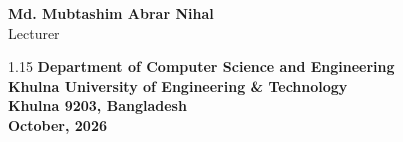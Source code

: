 \documentclass[11pt,a4paper]{article}
\newcommand{\SubmissionDate}{October, 2026}
\newcommand{\TeacherTwo}{Md. Mubtashim Abrar Nihal}
\newcommand{\TeacherTwoTitle}{Lecturer}
\begin{document}
\begin{titlepage}
\begin{center}
        {\fontsize{12}{15}\selectfont \textbf{\TeacherTwo}}\\
        {\fontsize{11}{14}\selectfont \TeacherTwoTitle}

        \vfill

        \begin{spacing}{1.15}
            {\fontsize{12}{16}\selectfont
            \textbf{Department of Computer Science and Engineering}}\\
            {\fontsize{12}{16}\selectfont
            \textbf{Khulna University of Engineering \& Technology}}\\
            {\fontsize{12}{16}\selectfont
            \textbf{Khulna 9203, Bangladesh}}\\
            {\fontsize{12}{16}\selectfont
            \textbf{\SubmissionDate}}
        \end{spacing}

    \end{center}
\end{titlepage}
\clearpage
{}
\setcounter{page}{1}
\onehalfspacing
\normalsize

\end{document}
